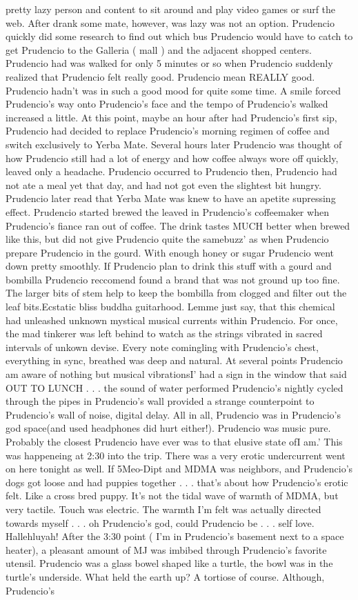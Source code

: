 \documentclass[12pt]{book}
\begin{document}
pretty lazy person and content to sit around and play video games or surf the web. After drank some mate, however, was lazy was not an option. Prudencio quickly did some research to find out which bus Prudencio would have to catch to get Prudencio to the Galleria ( mall ) and the adjacent shopped centers. Prudencio had was walked for only 5 minutes or so when Prudencio suddenly realized that Prudencio felt really good. Prudencio mean REALLY good. Prudencio hadn't was in such a good mood for quite some time. A smile forced Prudencio's way onto Prudencio's face and the tempo of Prudencio's walked increased a little. At this point, maybe an hour after had Prudencio's first sip, Prudencio had decided to replace Prudencio's morning regimen of coffee and switch exclusively to Yerba Mate. Several hours later Prudencio was thought of how Prudencio still had a lot of energy and how coffee always wore off quickly, leaved only a headache. Prudencio occurred to Prudencio then, Prudencio had not ate a meal yet that day, and had not got even the slightest bit hungry. Prudencio later read that Yerba Mate was knew to have an apetite supressing effect. Prudencio started brewed the leaved in Prudencio's coffeemaker when Prudencio's fiance ran out of coffee. The drink tastes MUCH better when brewed like this, but did not give Prudencio quite the samebuzz' as when Prudencio prepare Prudencio in the gourd. With enough honey or sugar Prudencio went down pretty smoothly. If Prudencio plan to drink this stuff with a gourd and bombilla Prudencio reccomend found a brand that was not ground up too fine. The larger bits of stem help to keep the bombilla from clogged and filter out the leaf bits.Ecstatic bliss buddha guitarhood. Lemme just say, that this chemical had unleashed unknown mystical musical currents within Prudencio. For once, the mad tinkerer was left behind to watch as the strings vibrated in sacred intervals of unkown devise. Every note comingling with Prudencio's chest, everything in sync, breathed was deep and natural. At several points Prudencio am aware of nothing but musical vibrationsI' had a sign in the window that said OUT TO LUNCH . . .  the sound of water performed Prudencio's nightly cycled through the pipes in Prudencio's wall provided a strange counterpoint to Prudencio's wall of noise, digital delay. All in all, Prudencio was in Prudencio's god space(and used headphones did hurt either!). Prudencio was music pure. Probably the closest Prudencio have ever was to that elusive state ofI am.' This was happeneing at 2:30 into the trip. There was a very erotic undercurrent went on here tonight as well. If 5Meo-Dipt and MDMA was neighbors, and Prudencio's dogs got loose and had puppies together . . .  that's about how Prudencio's erotic felt. Like a cross bred puppy. It's not the tidal wave of warmth of MDMA, but very tactile. Touch was electric. The warmth I'm felt was actually directed towards myself . . .  oh Prudencio's god, could Prudencio be . . .  self love. Hallehluyah! After the 3:30 point ( I'm in Prudencio's basement next to a space heater), a pleasant amount of MJ was imbibed through Prudencio's favorite utensil. Prudencio was a glass bowel shaped like a turtle, the bowl was in the turtle's underside. What held the earth up? A tortiose of course. Although, Prudencio's 
\end{document}
